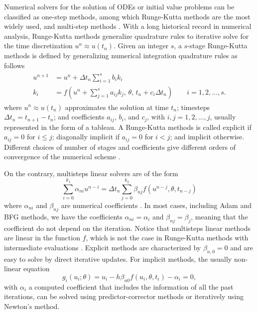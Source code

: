 Numerical solvers for the solution of ODEs or initial value problems can be classified as one-step methods, among which Runge-Kutta methods are the most widely used, and multi-step methods \cite{hairer-solving-1}.
With a long historical record in numerical analysis, Runge-Kutta methods generalize quadrature rules to iterative solve for the time discretization $u^{n} \approx u(t_n)$. 
Given an integer $s$, a $s$-stage Runge-Kutta methods is defined by generalizing numerical integration quadrature rules as follows
\begin{align}
\begin{split}
    u^{n+1} 
    &= 
    u^n 
    + 
    \Delta t_n \sum_{i=1}^s b_i k_i \\
    k_i 
    &= 
    f \left(u^n + \sum_{j=1}^s a_{ij} k_j , \, \theta , \, t_n + c_i \Delta t_n \right) \qquad i=1,2, \ldots, s.
    \label{eq:Runge-Kutta-scheme}
\end{split}
\end{align}
where $u^{n} \approx u(t_n)$ approximates the solution at time $t_n$; timesteps $\Delta t_n = t_{n+1}-t_n$; and coefficients $a_{ij}$, $b_i$, and $c_j$, with $i,j=1, 2,\ldots, j$, usually represented in the form of a tableau. 
A Runge-Kutta methods is called explicit if $a_{ij}=0$ for $i \leq j$; diagonally implicit if $a_{ij}=0$ for $i < j$; and implicit otherwise. 
Different choices of number of stages and coefficients give different orders of convergence of the numerical scheme \cite{Butcher_Wanner_1996, Butcher_2001}. 

On the contrary, multisteps linear solvers are of the form 
\begin{equation}
    \sum_{i=0}^{k_1} \alpha_{ni} u^{n-i} 
    =
    \Delta t_n \sum_{j=0}^{k_2} \beta_{nj} f(u^{n-j}, \theta, t_{n-j})
\end{equation}
where $\alpha_{ni}$ and $\beta_{nj}$ are numerical coefficients \cite{hairer-solving-1}.
In most cases, including Adam and BFG methods, we have the coefficients $\alpha_{ni} = \alpha_i$ and $\beta_{nj}=\beta_j$, meaning that the coefficient do not depend on the iteration. 
Notice that multisteps linear methods are linear in the function $f$, which is not the case in Runge-Kutta methods with intermediate evaluations \cite{ascher2008numerical}.
Explicit methods are characterized by $\beta_{n, 0} = 0$ and are easy to solve by direct iterative updates. 
For implicit methods, the usually non-linear equation 
\begin{equation}
    g_i(u_i; \theta) = u_i - h \beta_{n0} f(u_i, \theta, t_i) - \alpha_i = 0,
    \label{eq:solver-constriant-example}
\end{equation}
with $\alpha_i$ a computed coefficient that includes the information of all the past iterations, can be solved using predictor-corrector methods \cite{hairer-solving-1} or iteratively using Newton's method\cite{SUNDIALS-hindmarsh2005sundials}.  

